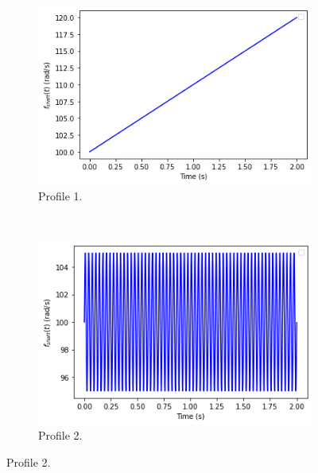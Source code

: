 \documentclass{article}
\begin{document}
	\begin{figure}[htb!]
		\centering
		\begin{subfigure}[b]{0.45\textwidth}
			\centering
			\includegraphics[width=\textwidth]{Q4_f1_1.png}
			\caption{Profile 1.}
		\end{subfigure}
		~
		\begin{subfigure}[b]{0.45\textwidth}
			\centering
			\includegraphics[width=\textwidth]{Q4_f2_1.png}
			\caption{Profile 2.}
		\end{subfigure}
		

\end{figure}
\end{document}
